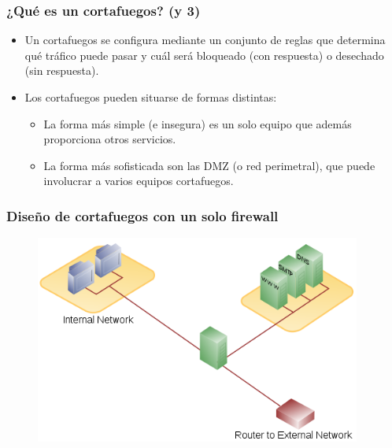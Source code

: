 \documentclass{beamer}
\begin{document}
\begin{frame}
\frametitle{¿Qué es un cortafuegos? (y 3)}

\begin{itemize}
\item Un cortafuegos se configura mediante un conjunto de reglas que determina qué tráfico puede pasar y cuál será bloqueado (con respuesta) o desechado (sin respuesta).
\item Los cortafuegos pueden situarse de formas distintas: 
	\begin{itemize}
	\item La forma más simple (e insegura) es un solo equipo que además proporciona otros servicios.
	\item La forma más sofisticada son las DMZ (o red perimetral), que puede involucrar a varios equipos cortafuegos. 
	\end{itemize}
\end{itemize}

\end{frame}


\begin{frame}
\frametitle{Diseño de cortafuegos con un solo firewall}

\begin{figure}[h]

\begin{center}
  \centering
  \includegraphics[height=2.7in]{figs/500px-DMZ_network_diagram_1_firewall.png}
\end{center}
\end{figure}

\end{frame}

\end{document}
